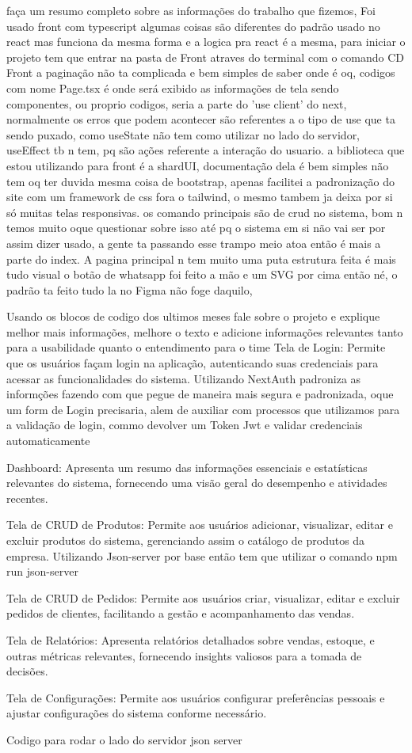 faça um resumo completo sobre as informações do trabalho que fizemos, 
Foi usado front com typescript algumas coisas são diferentes do padrão usado no react mas funciona da mesma forma e a logica pra react é a mesma, para iniciar o projeto tem que entrar na pasta de Front atraves do terminal com o comando CD Front a paginação não ta complicada e bem simples de saber onde é oq, codigos com nome Page.tsx é onde será exibido as informações de tela sendo componentes, ou proprio codigos, seria a parte do 'use client' do next, normalmente os erros que podem acontecer são referentes a o tipo de use que ta sendo puxado, como useState não tem como utilizar no lado do servidor, useEffect tb n tem, pq são ações referente a interação do usuario. a biblioteca que estou utilizando para front é a shardUI, documentação dela é bem simples não tem oq ter duvida mesma coisa de bootstrap, apenas facilitei a padronização do site com um framework de css fora o tailwind, o mesmo tambem ja deixa por si só muitas telas responsivas. os comando principais são de crud no sistema, bom n temos muito oque questionar sobre isso até pq o sistema em si não vai ser por assim dizer usado, a gente ta passando esse trampo meio atoa então é mais a parte do index. 
A pagina principal n tem muito uma puta estrutura feita é mais tudo visual o botão de whatsapp foi feito a mão e um SVG por cima então né, o padrão ta feito tudo la no Figma não foge daquilo, 

Usando os blocos de codigo dos ultimos meses fale sobre o projeto e explique melhor mais informações, melhore o texto e adicione informações relevantes tanto para a usabilidade quanto o entendimento para o time
Tela de Login: Permite que os usuários façam login na aplicação, autenticando suas credenciais para acessar as funcionalidades do sistema.
Utilizando NextAuth padroniza as informções fazendo com que pegue de maneira mais segura e padronizada, oque um form de Login precisaria, alem de auxiliar com processos que utilizamos para a validação de login, commo devolver um Token Jwt e validar credenciais automaticamente

Dashboard: Apresenta um resumo das informações essenciais e estatísticas relevantes do sistema, fornecendo uma visão geral do desempenho e atividades recentes.

Tela de CRUD de Produtos: Permite aos usuários adicionar, visualizar, editar e excluir produtos do sistema, gerenciando assim o catálogo de produtos da empresa.
Utilizando Json-server por base então tem que utilizar o comando npm run json-server

Tela de CRUD de Pedidos: Permite aos usuários criar, visualizar, editar e excluir pedidos de clientes, facilitando a gestão e acompanhamento das vendas.

Tela de Relatórios: Apresenta relatórios detalhados sobre vendas, estoque, e outras métricas relevantes, fornecendo insights valiosos para a tomada de decisões.

Tela de Configurações: Permite aos usuários configurar preferências pessoais e ajustar configurações do sistema conforme necessário.


Codigo para rodar o lado do servidor json server

